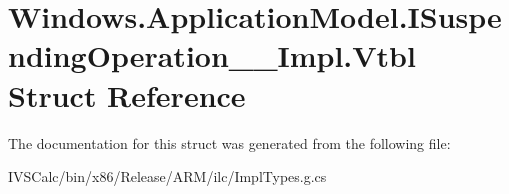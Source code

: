 \hypertarget{struct_windows_1_1_application_model_1_1_i_suspending_operation_____impl_1_1_vtbl}{}\section{Windows.\+Application\+Model.\+I\+Suspending\+Operation\+\_\+\+\_\+\+Impl.\+Vtbl Struct Reference}
\label{struct_windows_1_1_application_model_1_1_i_suspending_operation_____impl_1_1_vtbl}


The documentation for this struct was generated from the following file\+:\begin{DoxyCompactItemize}
\item 
I\+V\+S\+Calc/bin/x86/\+Release/\+A\+R\+M/ilc/Impl\+Types.\+g.\+cs\end{DoxyCompactItemize}
